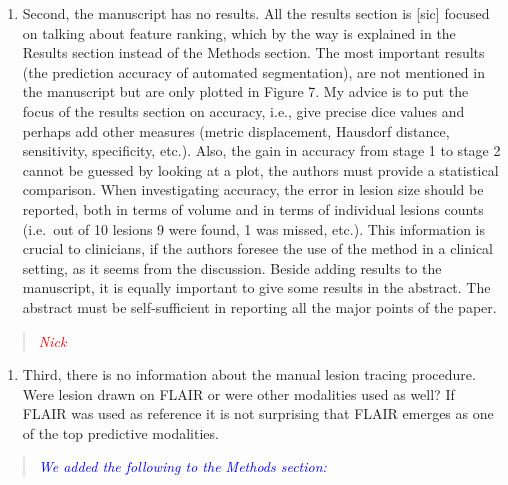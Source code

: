 \documentclass[12pt,]{article}
\providecommand{\tightlist}{%
  \setlength{\itemsep}{0pt}\setlength{\parskip}{0pt}}
\begin{document}
\begin{enumerate}
\def\labelenumi{\arabic{enumi}.}
\setcounter{enumi}{1}
\tightlist
\item
  Second, the manuscript has no results. All the results section is
  {[}sic{]} focused on talking about feature ranking, which by the way
  is explained in the Results section instead of the Methods section.
  The most important results (the prediction accuracy of automated
  segmentation), are not mentioned in the manuscript but are only
  plotted in Figure 7. My advice is to put the focus of the results
  section on accuracy, i.e., give precise dice values and perhaps add
  other measures (metric displacement, Hausdorf distance, sensitivity,
  specificity, etc.). Also, the gain in accuracy from stage 1 to stage 2
  cannot be guessed by looking at a plot, the authors must provide a
  statistical comparison. When investigating accuracy, the error in
  lesion size should be reported, both in terms of volume and in terms
  of individual lesions counts (i.e.~out of 10 lesions 9 were found, 1
  was missed, etc.). This information is crucial to clinicians, if the
  authors foresee the use of the method in a clinical setting, as it
  seems from the discussion. Beside adding results to the manuscript, it
  is equally important to give some results in the abstract. The
  abstract must be self-sufficient in reporting all the major points of
  the paper.
\end{enumerate}

\begin{quote}
\emph{\textcolor{red}{Nick}}
\end{quote}

\begin{enumerate}
\def\labelenumi{\arabic{enumi}.}
\setcounter{enumi}{2}
\tightlist
\item
  Third, there is no information about the manual lesion tracing
  procedure. Were lesion drawn on FLAIR or were other modalities used as
  well? If FLAIR was used as reference it is not surprising that FLAIR
  emerges as one of the top predictive modalities.
\end{enumerate}

\begin{quote}
\emph{\textcolor{blue}{We added the following to the Methods section:}}
\end{quote}
\end{document}
